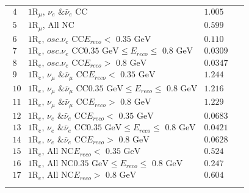 {\begin{longtable}{p{1.65cm}l}
{$${\begin{array}{c|c|c}
            4 &  \text{1R$_{\mu}$,\ \ }  \nu_e \text{ \& } \bar{\nu}_{e} \text{ CC}                                                                 & 1.005   \\
            5 & \text{1R$_{\mu}$,\ \ } \text{All NC}                                                                                              & 0.599   \\
	    6 &  \text{1R$_{e}$,\ \ } osc. \nu_e \text{ CC} E_{reco} < \text{ 0.35 GeV}                      &  0.110 \\
            7 &  \text{1R$_{e}$,\ \ }  osc. \nu_e \text{ CC}     \text{0.35 GeV} \leq E_{reco} \leq \text{ 0.8 GeV}                 &  0.0309 \\	
            8 &  \text{1R$_{e}$,\ \ }  osc. \nu_e \text{ CC}        E_{reco} > \text{ 0.8 GeV}               &  0.0347 \\	
            9 &  \text{1R$_{e}$,\ \ } \nu_\mu \text{ \& } \bar{\nu}_{\mu} \text{ CC}      E_{reco} < \text{ 0.35 GeV}                      &  1.244 \\
            10 &  \text{1R$_{e}$,\ \ } \nu_\mu \text{ \& } \bar{\nu}_{\mu} \text{ CC}     \text{0.35 GeV} \leq E_{reco} \leq \text{ 0.8 GeV}                 &  1.216 \\	
            11 &  \text{1R$_{e}$,\ \ }   \nu_\mu \text{ \& } \bar{\nu}_{\mu} \text{ CC}       E_{reco} > \text{ 0.8 GeV}               &  1.229 \\	
            12 &  \text{1R$_{e}$,\ \ } \nu_e \text{ \& } \bar{\nu}_{e} \text{ CC}    E_{reco} < \text{ 0.35 GeV}                      &  0.0683 \\
            13 &  \text{1R$_{e}$,\ \ }  \nu_e \text{ \& } \bar{\nu}_{e}  \text{ CC}    \text{0.35 GeV} \leq E_{reco} \leq \text{ 0.8 GeV}                 &  0.0421 \\	
            14 &  \text{1R$_{e}$,\ \ }   \nu_e \text{ \& } \bar{\nu}_{e}  \text{ CC}      E_{reco} > \text{ 0.8 GeV}               &  0.0628 \\
            15 &  \text{1R$_{e}$,\ \ }  \text{All NC}      E_{reco} < \text{ 0.35 GeV}                      &  0.524 \\
            16 &  \text{1R$_{e}$,\ \ }  \text{All NC}      \text{0.35 GeV} \leq E_{reco} \leq \text{ 0.8 GeV}                 &  0.247 \\	
            17 &  \text{1R$_{e}$,\ \ }   \text{All NC}       E_{reco} > \text{ 0.8 GeV}               &  0.604 \\	
         \end{array} }
$$}
\end{longtable}}
